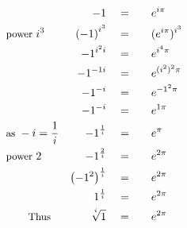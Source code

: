 \begin{alignat*}{5}
&\,&-1\quad&=\quad&&e^{i\pi}\\
&\small\text{power }\normalsize i^3&\left(-1\right)^{i^3}\quad&=&&(e^{i\pi})^{i^3}\\
&\,&-1^{i^2i}\quad&=&&e^{i^4\pi}\\
&\,&-1^{-1i}\quad&=&&e^{(i^2)^2\pi}\\
&\,&-1^{-i}\quad&=&&e^{-1^2\pi}\\
&\,&-1^{-i}\quad&=&&e^{1\pi}\\
&\small\text{as }\normalsize -i=\frac{1}{i}&-1^\frac{1}{i}\quad&=&&e^\pi\\
&\small\text{power }\normalsize 2&-1^\frac{2}{i}\quad&=&&e^{2\pi}\\
&\,&\left(-1^2\right)^\frac{1}{i}\quad&=&&e^{2\pi}\\
&\,&\quad1^{\frac{1}{i}}\quad&=&&e^{2\pi}\\
&\qquad\small\text{Thus}&\sqrt[^i]{1}\quad&=&&e^{2\pi}
\end{alignat*}
